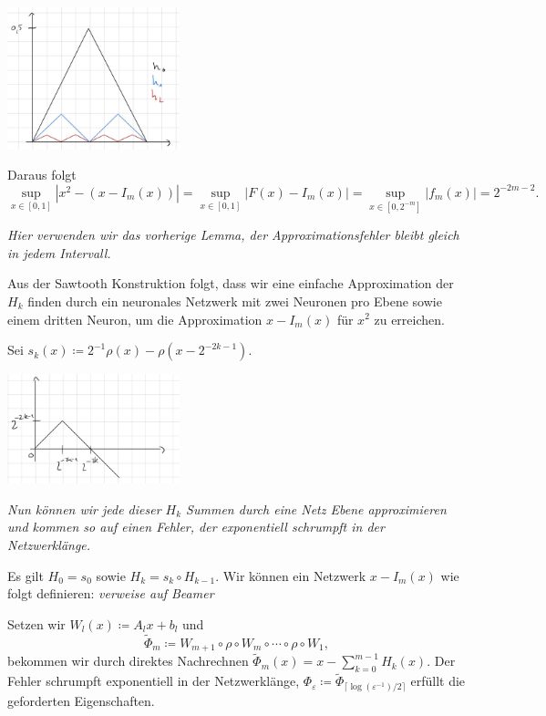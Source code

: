 \documentclass[12pt]{article}
\begin{document}
\begin{center}
    \includegraphics[width=5cm]{images/iii2_3.jpg} %
\end{center}

Daraus folgt 
\[ \sup_{x\in [0,1]} |x^2 - (x - I_m(x)) | = \sup_{x\in [0,1]} |F(x) - I_m(x) | = \sup_{x\in [0, 2^{-m}]} |f_m(x)| = 2^{-2m-2}. \]

\textit{Hier verwenden wir das vorherige Lemma, 
der Approximationsfehler bleibt gleich in jedem Intervall.}

Aus der Sawtooth Konstruktion folgt, dass wir eine einfache Approximation der \(H_k\) finden 
durch ein neuronales Netzwerk mit zwei Neuronen pro Ebene 
sowie einem dritten Neuron, um die Approximation \(x - I_m(x)\) für \(x^2\) zu erreichen.

Sei \(s_k(x) \coloneqq 2^{-1}\rho(x) - \rho(x - 2^{-2k-1})\).
\begin{center}
    \includegraphics[width=5cm]{images/iii2_4.jpg} %
\end{center}

\textit{Nun können wir jede dieser \(H_k\) Summen durch eine Netz Ebene approximieren 
und kommen so auf einen Fehler, der exponentiell schrumpft in der Netzwerklänge.}

Es gilt \(H_0 = s_0\) sowie \(H_k = s_k \circ H_{k-1}\). Wir können ein Netzwerk \(x - I_m(x)\) wie folgt definieren: 
\textit{verweise auf Beamer}

Setzen wir \(W_l(x) \coloneqq A_l x + b_l\) und 
\[ \tilde{\Phi}_m \coloneqq W_{m+1} \circ \rho \circ W_m \circ \cdots \circ \rho \circ W_1, \]
bekommen wir durch direktes Nachrechnen \(\tilde{\Phi}_m(x) = x - \sum_{k=0}^{m-1} H_k(x)\). 
Der Fehler schrumpft exponentiell in der Netzwerklänge, \(\Phi_\varepsilon \coloneqq \tilde{\Phi}_{\lceil \log(\varepsilon^{-1})/2 \rceil}\) 
erfüllt die geforderten Eigenschaften.
\end{document}
